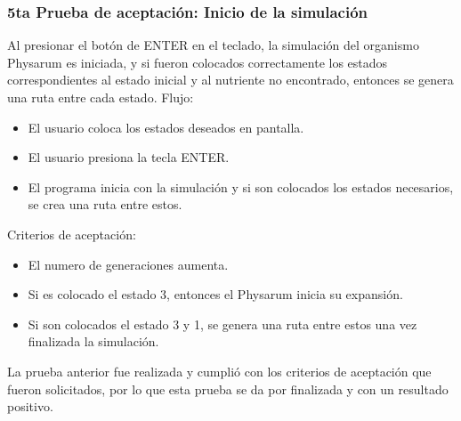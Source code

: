     \subsubsection{5ta Prueba de aceptaci\'on: Inicio de la simulaci\'on}
    Al presionar el bot\'on de ENTER en el teclado, la simulaci\'on del organismo Physarum es iniciada, y si fueron colocados
        correctamente los estados correspondientes al estado inicial
        y al nutriente no encontrado, entonces se genera una ruta
        entre cada estado.
    \vskip 0.5cm
    Flujo:
    \begin{itemize}
        \item El usuario coloca los estados deseados en pantalla.
        \item El usuario presiona la tecla ENTER.
        \item El programa inicia con la simulaci\'on y si son colocados
        los estados necesarios, se crea una ruta entre estos.
    \end{itemize}
    \vskip 0.5cm
    Criterios de aceptaci\'on:
    \begin{itemize}
        \item El numero de generaciones aumenta.
        \item Si es colocado el estado 3, entonces el Physarum inicia
        su expansi\'on.
        \item Si son colocados el estado 3 y 1, se genera una ruta entre
        estos una vez finalizada la simulaci\'on.
    \end{itemize}
    \vskip 0.5cm
    La prueba anterior fue realizada y cumpli\'o con los criterios
        de aceptaci\'on que fueron solicitados, por lo que esta prueba
        se da por finalizada y con un resultado positivo.